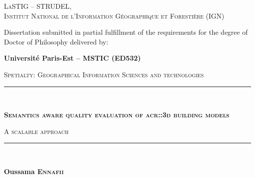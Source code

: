 \begin{titlepage}
    \begin{center}
        

        \vspace*{10mm}

        \begin{minipage}{.5\textwidth}
            \centering
            \textsc{LaSTIG -- STRUDEL,\\ Institut National de l'Information Géographique et Forestière (IGN)}
        \end{minipage}

        \vfill

        Dissertation submitted in partial fulfillment of the requirements for the degree of Doctor of Philosophy delivered by:

        \vspace*{5mm}

        \begin{Large}
            \textbf{Université Paris-Est -- MSTIC (ED532)}
        \end{Large}

        \vspace*{10mm}
        \begin{large}
            \textsc{Spetialty: Geographical Information Sciences and technologies}
        \end{large}
        \vspace*{10mm}

        \rule{\textwidth}{1.5pt}\\
        \begin{LARGE}
            \textsc{\textbf{Semantics aware quality evaluation of \acrshort*{acr::3d} building models}}\\
        \end{LARGE}
        \vspace*{2.5mm}
        \begin{Large}
            \textsc{A scalable approach}
        \end{Large}
        \rule{\textwidth}{1.5pt}\\

        \vspace*{10mm}

        \begin{large}
            \textbf{Oussama \textsc{Ennafii}}
        \end{large}


\end{center}
\end{titlepage}
